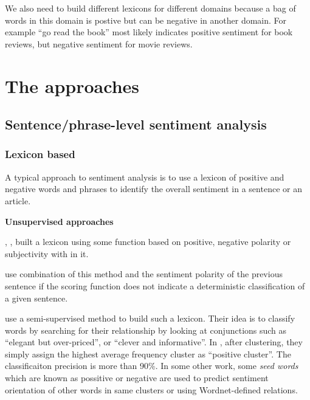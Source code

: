 \documentclass{article}
\begin{document}
\begin{multicols}{2}
    We also need to build different lexicons for different domains
because a bag of words in this domain is postive but can be negative in another
domain. For example ``go read the book'' most likely indicates positive
sentiment for book reviews, but negative sentiment for movie reviews.

 

\section{The approaches}

  \subsection{Sentence/phrase-level sentiment analysis}

    \subsubsection{Lexicon based}
      
        A typical approach to sentiment analysis is to use a lexicon of positive
  and negative words and phrases to identify the overall sentiment in a sentence
  or an article. 

        \textbf{Unsupervised approaches}

            \citet{Wiebe2000}, \citet{Turney2002}, \citet{Pan2010} built
a  lexicon using some function based on positive, negative polarity or
subjectivity  with in it.

            \citet{Liu98} use combination of this method and
the sentiment polarity of the previous sentence if the scoring function does
not indicate a deterministic classification of a given sentence.

            \citet{Hatzivassiloglou1997}
use a semi-supervised method to build such a lexicon. Their idea is to
classify words by searching for their relationship by looking at conjunctions 
such as ``elegant but over-priced'', or ``clever and informative''. In
\citet{Hatzivassiloglou1997}, after clustering, they simply assign the highest
average frequency cluster as ``positive cluster''. The classificaiton
precision is more than 90\%. In some other work, some \textit{seed words} which are
known as possitive or negative are used to predict sentiment orientation of other
words in same clusters or using Wordnet-defined relations.      		
            

\end{multicols}
\end{document}
